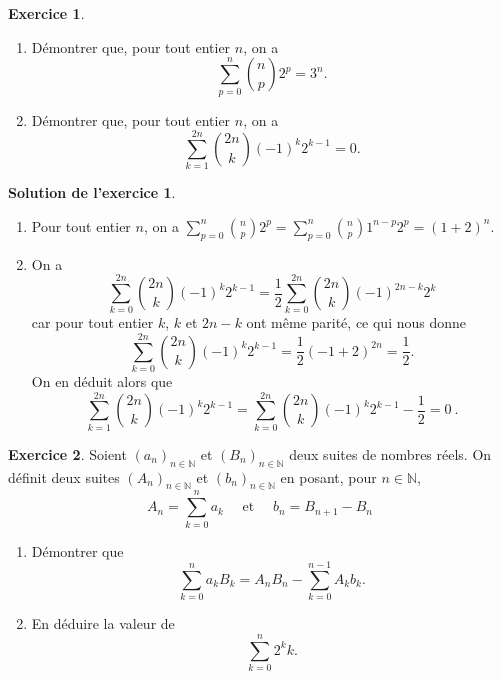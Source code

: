 \documentclass[a4paper, 11pt,openany]{article}%
\theoremstyle{plain}
\theoremstyle{definition}
\newtheorem{exo}{Exercice}
\newtheorem{sol}{Solution de l'exercice}
\theoremstyle{remark}
\newcommand{\N}{\mathbb{N}}
\begin{document}
\begin{exo}
	\begin{enumerate}
		\item Démontrer que, pour tout entier $n$, on a $$\sum_{p=0}^n\binom{n}{p}2^p = 3^n.$$
		\item Démontrer que, pour tout entier $n$, on a $$\sum_{k=1}^{2n} \binom{2n}{k}(-1)^k2^{k-1} = 0.$$
	\end{enumerate}
\end{exo}

\begin{sol}
	\begin{enumerate}
		\item Pour tout entier $n$, on a $\sum_{p=0}^n\binom{n}{p}2^p = \sum_{p=0}^n\binom{n}{p}1^{n-p}2^p=(1+2)^n$.
		\item On a 
		\[
			\sum_{k=0}^{2n}	\binom{2n}{k}(-1)^k2^{k-1} = \frac{1}{2} \sum_{k=0}^{2n} \binom{2n}{k}(-1)^{2n-k}2^{k}
		\]
		car pour tout entier $k$, $k$ et $2n-k$ ont même parité, ce qui nous donne 
		\[
			\sum_{k=0}^{2n}	\binom{2n}{k}(-1)^k2^{k-1} = \frac{1}{2} (-1+2)^{2n} = \frac{1}{2}.
		\]
		On en déduit alors que 
		\[
			\sum_{k=1}^{2n}	\binom{2n}{k}(-1)^k2^{k-1} = \sum_{k=0}^{2n}	\binom{2n}{k}(-1)^k2^{k-1} - \frac{1}{2} = 0 \ .
		\]
	\end{enumerate}
\end{sol}

  \begin{exo}
	Soient $(a_n)_{n\in \N}$ et $(B_n)_{n\in \N}$ deux suites de nombres réels. On définit deux suites $(A_n)_{n\in \N}$ et $(b_n)_{n\in\N}$ en posant, pour $n\in \N$, 
	\[
		A_n = \sum_{k=0}^n a_k 
		\quad  \mbox{ et }\quad 
		b_n = B_{n+1} - B_n 
	\]
	\begin{enumerate}[label=\arabic*.]
		\item Démontrer que $$\sum_{k=0}^n a_kB_k = A_nB_n - \sum_{k=0}^{n-1}A_kb_k .$$
		\item En déduire la valeur de $$\sum_{k=0}^n 2^k k. $$
	\end{enumerate}
\end{exo}
\end{document}

